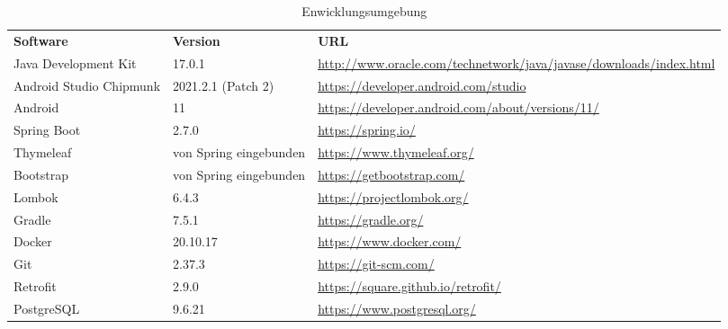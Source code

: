 \begin{table}[h]
	\centering
	\begin{tabularx}{\textwidth}{l l X}
		\rowcolor[HTML]{C0C0C0} 
		\textbf{Software} & \textbf{Version} & \textbf{URL} \\
		Java Development Kit & 17.0.1 & \url{http://www.oracle.com/technetwork/java/javase/downloads/index.html} \\
		\rowcolor[HTML]{E7E7E7} 
		Android Studio Chipmunk & 2021.2.1 (Patch 2) & \url{https://developer.android.com/studio} \\
		Android & 11 & \url{https://developer.android.com/about/versions/11/} \\
		\rowcolor[HTML]{E7E7E7} 
		Spring Boot & 2.7.0 & \url{https://spring.io/} \\
		Thymeleaf & von Spring eingebunden & \url{https://www.thymeleaf.org/} \\
		\rowcolor[HTML]{E7E7E7} 
		Bootstrap & von Spring eingebunden & \url{https://getbootstrap.com/} \\
		Lombok & 6.4.3 & \url{https://projectlombok.org/} \\
		\rowcolor[HTML]{E7E7E7} 
		Gradle & 7.5.1 & \url{https://gradle.org/} \\
		Docker & 20.10.17 & \url{https://www.docker.com/} \\
		\rowcolor[HTML]{E7E7E7} 
		Git & 2.37.3 & \url{https://git-scm.com/} \\
		Retrofit & 2.9.0 & \url{https://square.github.io/retrofit/} \\
		\rowcolor[HTML]{E7E7E7} 
		PostgreSQL & 9.6.21  & \url{https://www.postgresql.org/}\\
	\end{tabularx}
	\caption{Enwicklungsumgebung}
	\label{table:entwicklungsumgebung}
\end{table}
